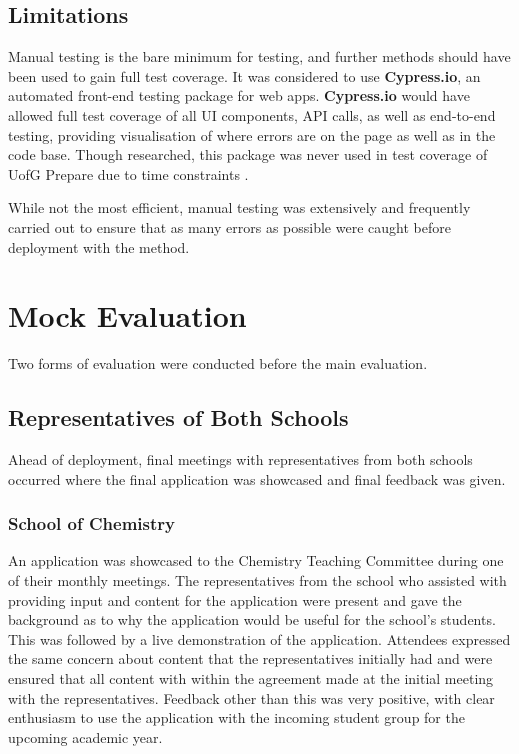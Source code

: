 \documentclass{l4proj}
\begin{document}
\subsection{Limitations}
Manual testing is the bare minimum for testing,  and further methods should have been used to gain full test coverage. It was considered to use \textbf{Cypress.io},  an automated front-end testing package for web apps. \textbf{Cypress.io} would have allowed full test coverage of all UI components,  API calls,  as well as end-to-end testing,  providing visualisation of where errors are on the page as well as in the code base. Though researched, this package was never used in test coverage of UofG Prepare due to time constraints .

While not the most efficient,  manual testing was extensively and frequently carried out to ensure that as many errors as possible were caught before deployment with the method.

\section{Mock Evaluation}
Two forms of evaluation were conducted before the main evaluation.

\subsection{Representatives of Both Schools}
Ahead of deployment,  final meetings with representatives from both schools occurred where the final application was showcased and final feedback was given.

\subsubsection{School of Chemistry}
An application was showcased to the Chemistry Teaching Committee during one of their monthly meetings. The representatives from the school who assisted with providing input and content for the application were present and gave the background as to why the application would be useful for the school's students. This was followed by a live demonstration of the application. Attendees expressed the same concern about content that the representatives initially had and were ensured that all content with within the agreement made at the initial meeting with the representatives. Feedback other than this was very positive,  with clear enthusiasm to use the application with the incoming student group for the upcoming academic year.
\end{document}
